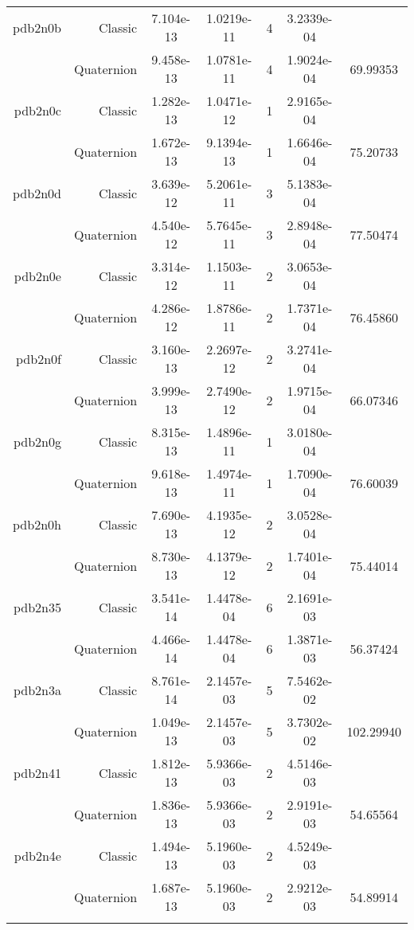\begin{xltabular}{\textwidth}{r|rS[table-format=1.3e+2]S[table-format=1.4e+2]cS[table-format=1.4e+2]S[table-format=-1.5]}
pdb2n0b & Classic & 7.104e-13 & 1.0219e-11 & 4 & 3.2339e-04 & \\
& Quaternion & 9.458e-13 & 1.0781e-11 & 4 & 1.9024e-04 & 69.99353\\  \addlinespace
pdb2n0c & Classic & 1.282e-13 & 1.0471e-12 & 1 & 2.9165e-04 & \\
& Quaternion & 1.672e-13 & 9.1394e-13 & 1 & 1.6646e-04 & 75.20733\\  \addlinespace
pdb2n0d & Classic & 3.639e-12 & 5.2061e-11 & 3 & 5.1383e-04 & \\
& Quaternion & 4.540e-12 & 5.7645e-11 & 3 & 2.8948e-04 & 77.50474\\  \addlinespace
pdb2n0e & Classic & 3.314e-12 & 1.1503e-11 & 2 & 3.0653e-04 & \\
& Quaternion & 4.286e-12 & 1.8786e-11 & 2 & 1.7371e-04 & 76.45860\\  \addlinespace
pdb2n0f & Classic & 3.160e-13 & 2.2697e-12 & 2 & 3.2741e-04 & \\
& Quaternion & 3.999e-13 & 2.7490e-12 & 2 & 1.9715e-04 & 66.07346\\  \addlinespace
pdb2n0g & Classic & 8.315e-13 & 1.4896e-11 & 1 & 3.0180e-04 & \\
& Quaternion & 9.618e-13 & 1.4974e-11 & 1 & 1.7090e-04 & 76.60039\\  \addlinespace
pdb2n0h & Classic & 7.690e-13 & 4.1935e-12 & 2 & 3.0528e-04 & \\
& Quaternion & 8.730e-13 & 4.1379e-12 & 2 & 1.7401e-04 & 75.44014\\  \addlinespace
pdb2n35 & Classic & 3.541e-14 & 1.4478e-04 & 6 & 2.1691e-03 & \\
& Quaternion & 4.466e-14 & 1.4478e-04 & 6 & 1.3871e-03 & 56.37424\\  \addlinespace
pdb2n3a & Classic & 8.761e-14 & 2.1457e-03 & 5 & 7.5462e-02 & \\
& Quaternion & 1.049e-13 & 2.1457e-03 & 5 & 3.7302e-02 & 102.29940\\  \addlinespace
pdb2n41 & Classic & 1.812e-13 & 5.9366e-03 & 2 & 4.5146e-03 & \\
& Quaternion & 1.836e-13 & 5.9366e-03 & 2 & 2.9191e-03 & 54.65564\\  \addlinespace
pdb2n4e & Classic & 1.494e-13 & 5.1960e-03 & 2 & 4.5249e-03 & \\
& Quaternion & 1.687e-13 & 5.1960e-03 & 2 & 2.9212e-03 & 54.89914\\  \addlinespace

\end{xltabular}
